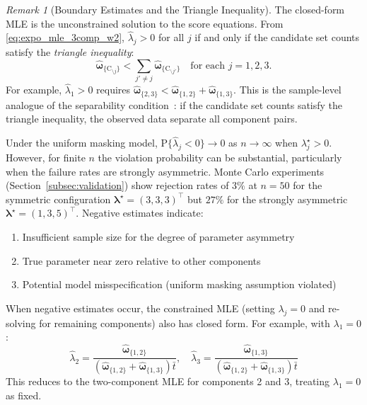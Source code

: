 \documentclass[12pt]{article}
\newcommand{\RV}[1]{\mathrm{#1}}
\newcommand{\Prob}[1]{\mathrm{P}\{#1\}}
\newcommand{\cand}{\RV{C}}         %
\newcommand{\tparam}[1]{{#1}^{\star}}  %
\newcommand{\estimator}[1]{\hat{#1}}   %
\newcommand{\cntsymb}{\boldsymbol{\hat\omega}}
\newcommand{\cnt}[1]{\cntsymb_{\{#1\}}}
\renewcommand{\vec}[1]{\boldsymbol{#1}}
\theoremstyle{definition}
\theoremstyle{remark}
\newtheorem{remark}[theorem]{Remark}
\begin{document}
\begin{remark}[Boundary Estimates and the Triangle Inequality]
\label{rem:boundary_estimates}
The closed-form MLE is the unconstrained solution to the score equations. From \eqref{eq:expo_mle_3comp_w2}, $\estimator{\lambda}_j > 0$ for all $j$ if and only if the candidate set counts satisfy the \emph{triangle inequality}:
\begin{equation}
\label{eq:triangle_ineq}
\cnt{\cand_{\setminus j}} < \sum_{j' \neq j} \cnt{\cand_{\setminus j'}} \quad \text{for each } j = 1, 2, 3.
\end{equation}
For example, $\estimator{\lambda}_1 > 0$ requires $\cnt{2,3} < \cnt{1,2} + \cnt{1,3}$. This is the sample-level analogue of the separability condition~\cite{towell2025masked}: if the candidate set counts satisfy the triangle inequality, the observed data separate all component pairs.

Under the uniform masking model, $\Prob{\estimator{\lambda}_j < 0} \to 0$ as $n \to \infty$ when $\tparam{\lambda}_j > 0$. However, for finite $n$ the violation probability can be substantial, particularly when the failure rates are strongly asymmetric. Monte Carlo experiments (Section~\ref{subsec:validation}) show rejection rates of $3\%$ at $n=50$ for the symmetric configuration $\tparam{\vec{\lambda}} = (3,3,3)^\top$ but $27\%$ for the strongly asymmetric $\tparam{\vec{\lambda}} = (1,3,5)^\top$. Negative estimates indicate:
\begin{enumerate}
\item Insufficient sample size for the degree of parameter asymmetry
\item True parameter near zero relative to other components
\item Potential model misspecification (uniform masking assumption violated)
\end{enumerate}

When negative estimates occur, the constrained MLE (setting $\lambda_j = 0$ and re-solving for remaining components) also has closed form. For example, with $\lambda_1 = 0$:
\begin{equation}
\estimator{\lambda}_2 = \frac{\cnt{1,2}}{(\cnt{1,2} + \cnt{1,3})\bar{t}}, \quad
\estimator{\lambda}_3 = \frac{\cnt{1,3}}{(\cnt{1,2} + \cnt{1,3})\bar{t}}
\end{equation}
This reduces to the two-component MLE for components 2 and 3, treating $\lambda_1 = 0$ as fixed.
\end{remark}
\end{document}
